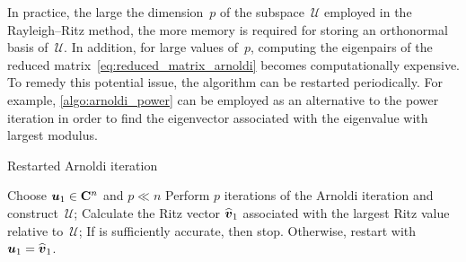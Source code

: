 In practice, the large the dimension~$p$ of the subspace~$\mathcal U$ employed in the Rayleigh--Ritz method,
the more memory is required for storing an orthonormal basis of~$\mathcal U$.
In addition, for large values of~$p$,
computing the eigenpairs of the reduced matrix~\eqref{eq:reduced_matrix_arnoldi} becomes computationally expensive.
To remedy this potential issue,
the algorithm can be restarted periodically.
For example, \cref{algo:arnoldi_power} can be employed as an alternative to the power iteration
in order to find the eigenvector associated with the eigenvalue with largest modulus.

\begin{algorithm}
\caption{Restarted Arnoldi iteration}%
\label{algo:arnoldi_power}%
\begin{algorithmic}
\State Choose $\mathbf{\boldsymbol{u}}_1 \in \mathbf C^n$ and $p \ll n$
    \State Perform $p$ iterations of the Arnoldi iteration and construct~$\mathcal U$;
    \State Calculate the Ritz vector $\widehat {\mathbf{\boldsymbol{v}}}_1$ associated with the largest Ritz value relative to~$\mathcal U$;
    \State If is sufficiently accurate, then stop. Otherwise, restart with $\mathbf{\boldsymbol{u}}_1 = \widehat {\mathbf{\boldsymbol{v}}}_1$.
\EndFor
\end{algorithmic}
\end{algorithm}

